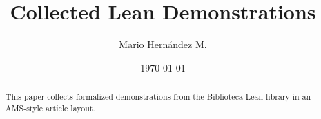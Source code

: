 \documentclass[11pt]{amsart}
\title[Collected Lean Demonstrations]{Collected Lean Demonstrations}
\author{Mario Hernández M.}
\date{\today}
\begin{document}
\begin{abstract}
This paper collects formalized demonstrations from the Biblioteca Lean library in
an AMS-style article layout.
\end{abstract}
\maketitle
\tableofcontents

\end{document}
